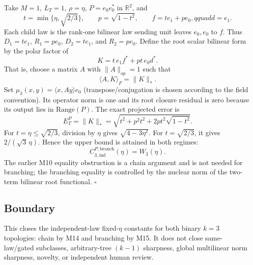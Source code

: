 Take $M=1$, $L_T=1$, $\rho=\eta$, $P=e_0e_0^*$ in $\mathbb R^2$, and
\[
 t=\min\{\eta,\sqrt{2/3}\},\qquad p=\sqrt{1-t^2},\qquad
 f=t e_1+p e_0,qquad d=e_1.
\]
Each child law is the rank-one bilinear law sending unit leaves $e_0,e_0$
to $f$. Thus $D_1=t e_1$, $R_1=p e_0$, $D_2=t e_1$, and
$R_2=p e_0$. Define the root scalar bilinear form by the polar factor of
\[
 K=t\,e_1 f^*+pt\,e_0d^*.
\]
That is, choose a matrix $A$ with $\|A\|_{op}=1$ such that
\[
 \langle A,K\rangle_F=\|K\|_*.
\]
Set $\mu_3(x,y)=\langle x,Ay\rangle e_0$ (transpose/conjugation is chosen
according to the field convention). Its operator norm is one and its root
closure residual is zero because its output lies in $\mathrm{Range}(P)$.
The exact projected error is
\[
 E_T^P=\|K\|_*
 =\sqrt{t^2+p^2t^2+2pt^2\sqrt{1-t^2}}.
\tag{M15.3}
\]
For $t=\eta\le\sqrt{2/3}$, division by $\eta$ gives
$\sqrt{4-3\eta^2}$. For $t=\sqrt{2/3}$, it gives
$2/(\sqrt3\,\eta)$. Hence the upper bound is attained in both regimes:
\[
 \boxed{C_{3,\mathrm{ind}}^{P,\mathrm{branch}}(\eta)=W_3(\eta).}
\]
The earlier M10 equality obstruction is a chain argument and is not needed
for branching; the branching equality is controlled by the nuclear norm of
the two-term bilinear root functional. \hfill$\square$

\subsection*{Boundary}

This closes the independent-law fixed-$\eta$ constants for both binary
$k=3$ topologies: chain by M14 and branching by M15. It does not close
same-law/gated subclasses, arbitrary-tree $(k-1)$ sharpness, global multilinear
norm sharpness, novelty, or independent human review.
